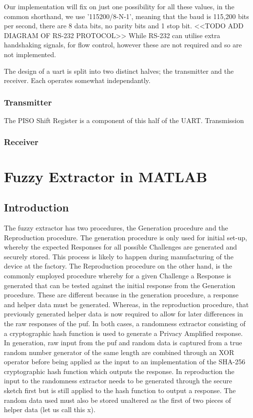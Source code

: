 Our implementation will fix on just one possibility for all these values,
in the common shorthand, we use '115200/8-N-1', meaning that
the baud is 115,200 bits per second, there are 8 data bits, no parity bits
and 1 stop bit. <<TODO ADD DIAGRAM OF RS-232 PROTOCOL>>
While RS-232 can utilise extra handshaking signals, for flow control,
however these are not required and so are not implemented.

The design of a \gls{uart} is split into two distinct halves; the transmitter
and the receiver. Each operates somewhat independantly. 

\subsubsection{Transmitter}

The PISO Shift Register is a component of this half of the UART.
Transmission

\subsubsection{Receiver}

\section{Fuzzy Extractor in MATLAB}

\subsection{Introduction}

The fuzzy extractor has two procedures, the Generation procedure and the
Reproduction procedure.
The generation procedure is only used for initial set-up, whereby the expected
Responses for all possible Challenges are generated and securely stored.
This process is likely to happen during manufacturing of the device at the
factory.
The Reproduction procedure on the other hand, is the commonly employed procedure
whereby for a given Challenge a Response is generated that can be tested against
the initial response from the Generation procedure. 
These are different because in the generation procedure, a response and helper
data must be generated.
Whereas, in the reproduction procedure, that previously generated helper data is
now required to allow for later differences in the raw responses of the \gls{puf}. 
In both cases, a randomness extractor consisting of a cryptographic hash
function is used to generate a Privacy Amplified response. In generation, raw
input from the \gls{puf} and random data is captured from a true random number
generator of the same length are combined through an XOR operator before being
applied as the input to an implementation of the SHA-256 cryptographic hash
function which outputs the response. In reproduction the input to the randomness
extractor needs to be generated through the secure sketch first but is still
applied to the hash function to output a response. The random data used must
also be stored unaltered as the first of two pieces of helper data
(let us call this x).

